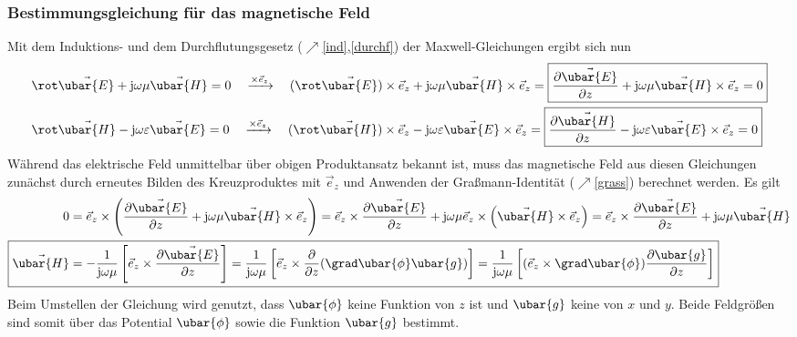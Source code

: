\subsubsection{Bestimmungsgleichung für das magnetische Feld}
Mit dem Induktions- und dem Durchflutungsgesetz ($\nearrow$\ref{ind},\ref{durchf}) der Maxwell-Gleichungen ergibt sich nun
\begin{align}
	& \rot \vec{\ubar{E}}+\mathrm{j} \omega \mu \vec{\ubar{H}}=0 \quad \xrightarrow{\times \vec{e}_{z}} \quad(\rot \vec{\ubar{E}}) \times \vec{e}_{z}+\mathrm{j} \omega \mu \vec{\ubar{H}} \times \vec{e}_{z}=\boxed{\frac{\partial \vec{\ubar{E}}}{\partial z}+\mathrm{j} \omega \mu \vec{\ubar{H}} \times \vec{e}_{z}=0} \label{indang}  \\
	& \rot \vec{\ubar{H}}-\mathrm{j} \omega \varepsilon \vec{\ubar{E}}=0 \quad \xrightarrow{\times \vec{e}_{z}} \quad(\rot \vec{\ubar{H}}) \times \vec{e}_{z}-\mathrm{j} \omega \varepsilon \vec{\ubar{E}} \times \vec{e}_{z}=\boxed{\frac{\partial \vec{\ubar{H}}}{\partial z}-\mathrm{j} \omega \varepsilon \vec{\ubar{E}} \times \vec{e}_{z}=0 }
\end{align}
Während das elektrische Feld unmittelbar über obigen Produktansatz bekannt ist, muss das magnetische Feld aus diesen Gleichungen zunächst durch erneutes Bilden des Kreuzproduktes mit $\vec{e}_{z}$ und Anwenden der Graßmann-Identität ($\nearrow$\ref{grass}) berechnet werden. Es gilt
\begin{align}
	0 & =\vec{e}_{z} \times\left(\frac{\partial \vec{\ubar{E}}}{\partial z}+\mathrm{j} \omega \mu \vec{\ubar{H}} \times \vec{e}_{z}\right)=\vec{e}_{z} \times \frac{\partial \vec{\ubar{E}}}{\partial z}+\mathrm{j} \omega \mu \vec{e}_{z} \times\left(\vec{\ubar{H}} \times \vec{e}_{z}\right)=\vec{e}_{z} \times \frac{\partial \vec{\ubar{E}}}{\partial z}+\mathrm{j} \omega \mu \vec{\ubar{H}} \nonumber \\
	\Aboxed{\vec{\ubar{H}} & =-\frac{1}{\mathrm{j} \omega \mu}\left[\vec{e}_{z} \times \frac{\partial \vec{\ubar{E}}}{\partial z}\right]=\frac{1}{\mathrm{j} \omega \mu}\left[\vec{e}_{z} \times \frac{\partial}{\partial z}(\grad \ubar{\phi} \ubar{g})\right]=\frac{1}{\mathrm{j} \omega \mu}\left[(\vec{e}_{z} \times \grad \ubar{\phi}) \frac{\partial \ubar{g}}{\partial z}\right] }\label{bestH}
\end{align}
Beim Umstellen der Gleichung wird genutzt, dass $\ubar{\phi}$ keine Funktion von $z$ ist und $\ubar{g}$ keine von $x$ und $y$. Beide Feldgrößen sind somit über das Potential $\ubar{\phi}$ sowie die Funktion $\ubar{g}$ bestimmt. 
